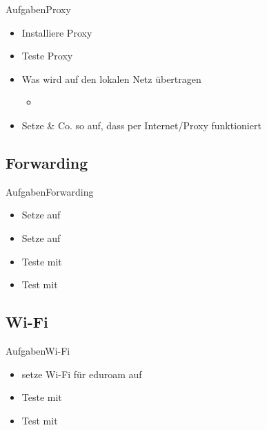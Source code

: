 \documentclass{beamer}
\begin{document}
\begin{frame}{Aufgaben}{Proxy}
 \begin{itemize}
  \item Installiere Proxy
  \item Teste Proxy 
  \item Was wird auf den lokalen Netz übertragen 
  \begin{itemize}
   \item {}
  \end{itemize}
  \item Setze  \& Co. so auf, dass \target per Internet/Proxy funktioniert 
 \end{itemize}
\end{frame}

\subsection{Forwarding}

\begin{frame}{Aufgaben}{Forwarding}
 \begin{itemize}
  \item Setze \host auf
  \item Setze \target auf
  \item Teste mit 
  \item Test mit 
 \end{itemize}
\end{frame}

\subsection{Wi-Fi}
\begin{frame}{Aufgaben}{Wi-Fi}
 \begin{itemize}
  \item setze Wi-Fi für eduroam auf
  \item Teste mit 
  \item Test mit 
 \end{itemize}
\end{frame}
\end{document}
